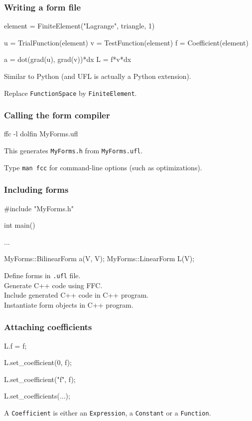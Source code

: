 \documentclass{fenicscourse}
\begin{document}
\begin{frame}[fragile]
  \frametitle{Writing a form file}

\begin{python}
element = FiniteElement("Lagrange", triangle, 1)

u = TrialFunction(element)
v = TestFunction(element)
f = Coefficient(element)

a = dot(grad(u), grad(v))*dx
L = f*v*dx
\end{python}

\bigskip

Similar to Python (and UFL is actually a Python extension).

\bigskip

Replace \texttt{FunctionSpace} by \texttt{FiniteElement}.

\end{frame}

\begin{frame}[fragile]
  \frametitle{Calling the form compiler}

\begin{bash}
ffc -l dolfin MyForms.ufl
\end{bash}

\bigskip

This generates \texttt{MyForms.h} from \texttt{MyForms.ufl}.

\bigskip

Type \texttt{man fcc} for command-line options (such as optimizations).

\end{frame}

\begin{frame}[fragile]
  \frametitle{Including forms}

  \begin{c++}
#include "MyForms.h"

int main()
{
  ...

  MyForms::BilinearForm a(V, V);
  MyForms::LinearForm L(V);

}
  \end{c++}

Define forms in \texttt{.ufl} file. \\
Generate C++ code using FFC. \\
Include generated C++ code in C++ program. \\
Instantiate form objects in C++ program.

\end{frame}

\begin{frame}[fragile]
  \frametitle{Attaching coefficients}

\begin{c++}
L.f = f;

L.set_coefficient(0, f);

L.set_coefficient("f", f);

L.set_coefficients(...);
\end{c++}

  \bigskip

  A \texttt{Coefficient} is either an
  \texttt{Expression}, a
  \texttt{Constant} or a
  \texttt{Function}.

\end{frame}
\end{document}
